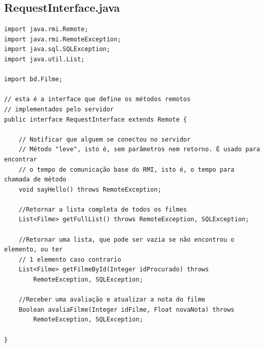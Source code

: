 \documentclass[11pt,twoside]{article}
\begin{document}
\subsection{RequestInterface.java}       %
\begin{verbatim}
import java.rmi.Remote;
import java.rmi.RemoteException;
import java.sql.SQLException;
import java.util.List;

import bd.Filme;

// esta é a interface que define os métodos remotos 
// implementados pelo servidor 
public interface RequestInterface extends Remote {
	
	// Notificar que alguem se conectou no servidor
	// Método "leve", isto é, sem parâmetros nem retorno. É usado para encontrar 
	// o tempo de comunicação base do RMI, isto é, o tempo para chamada de método
	void sayHello() throws RemoteException;
	
	//Retornar a lista completa de todos os filmes
	List<Filme> getFullList() throws RemoteException, SQLException;
	
	//Retornar uma lista, que pode ser vazia se não encontrou o elemento, ou ter 
	// 1 elemento caso contrario
	List<Filme> getFilmeById(Integer idProcurado) throws 
		RemoteException, SQLException;
	
	//Receber uma avaliação e atualizar a nota do filme
	Boolean avaliaFilme(Integer idFilme, Float novaNota) throws 
		RemoteException, SQLException;
	
}
\end{verbatim}



\end{document}
